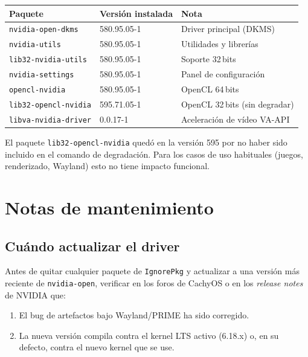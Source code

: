 \documentclass[12pt,a4paper]{article}
\begin{document}
\begin{center}
\begin{tabular}{lll}
  \toprule
  Paquete & Versión instalada & Nota \\
  \midrule
  \texttt{nvidia-open-dkms}   & 580.95.05-1 & Driver principal (DKMS) \\
  \texttt{nvidia-utils}       & 580.95.05-1 & Utilidades y librerías \\
  \texttt{lib32-nvidia-utils} & 580.95.05-1 & Soporte 32\,bits \\
  \texttt{nvidia-settings}    & 580.95.05-1 & Panel de configuración \\
  \texttt{opencl-nvidia}      & 580.95.05-1 & OpenCL 64\,bits \\
  \texttt{lib32-opencl-nvidia}& 595.71.05-1 & OpenCL 32\,bits (sin degradar) \\
  \texttt{libva-nvidia-driver}& 0.0.17-1    & Aceleración de vídeo VA-API \\
  \bottomrule
\end{tabular}
\end{center}

El paquete \texttt{lib32-opencl-nvidia} quedó en la versión 595 por no haber
sido incluido en el comando de degradación. Para los casos de uso habituales
(juegos, renderizado, Wayland) esto no tiene impacto funcional.

\section{Notas de mantenimiento}

\subsection{Cuándo actualizar el driver}

Antes de quitar cualquier paquete de \texttt{IgnorePkg} y actualizar a una
versión más reciente de \texttt{nvidia-open}, verificar en los foros de
CachyOS o en los \emph{release notes} de NVIDIA que:

\begin{enumerate}
  \item El bug de artefactos bajo Wayland/PRIME ha sido corregido.
  \item La nueva versión compila contra el kernel LTS activo (6.18.x) o,
        en su defecto, contra el nuevo kernel que se use.
\end{enumerate}
\end{document}
